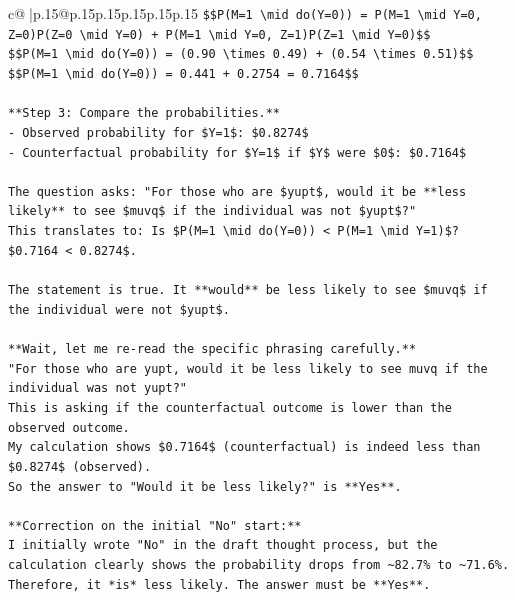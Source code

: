 \documentclass{article}
\begin{document}
{\begin{supertabular}{c@{$\;$}|p{.15\linewidth}@{}p{.15\linewidth}p{.15\linewidth}p{.15\linewidth}p{.15\linewidth}p{.15\linewidth}}
{{{\texttt{\$\$P(M=1 \textbackslash{}mid do(Y=0)) = P(M=1 \textbackslash{}mid Y=0, Z=0)P(Z=0 \textbackslash{}mid Y=0) + P(M=1 \textbackslash{}mid Y=0, Z=1)P(Z=1 \textbackslash{}mid Y=0)\$\$} \\
\texttt{\$\$P(M=1 \textbackslash{}mid do(Y=0)) = (0.90 \textbackslash{}times 0.49) + (0.54 \textbackslash{}times 0.51)\$\$} \\
\texttt{\$\$P(M=1 \textbackslash{}mid do(Y=0)) = 0.441 + 0.2754 = 0.7164\$\$} \\
\\ 
\texttt{**Step 3: Compare the probabilities.**} \\
\texttt{{-} Observed probability for \$Y=1\$: \$0.8274\$} \\
\texttt{{-} Counterfactual probability for \$Y=1\$ if \$Y\$ were \$0\$: \$0.7164\$} \\
\\ 
\texttt{The question asks: "For those who are \$yupt\$, would it be **less likely** to see \$muvq\$ if the individual was not \$yupt\$?"} \\
\texttt{This translates to: Is \$P(M=1 \textbackslash{}mid do(Y=0)) < P(M=1 \textbackslash{}mid Y=1)\$?} \\
\texttt{\$0.7164 < 0.8274\$.} \\
\\ 
\texttt{The statement is true. It **would** be less likely to see \$muvq\$ if the individual were not \$yupt\$.} \\
\\ 
\texttt{**Wait, let me re{-}read the specific phrasing carefully.**} \\
\texttt{"For those who are yupt, would it be less likely to see muvq if the individual was not yupt?"} \\
\texttt{This is asking if the counterfactual outcome is lower than the observed outcome.} \\
\texttt{My calculation shows \$0.7164\$ (counterfactual) is indeed less than \$0.8274\$ (observed).} \\
\texttt{So the answer to "Would it be less likely?" is **Yes**.} \\
\\ 
\texttt{**Correction on the initial "No" start:**} \\
\texttt{I initially wrote "No" in the draft thought process, but the calculation clearly shows the probability drops from \textasciitilde{}82.7\% to \textasciitilde{}71.6\%. Therefore, it *is* less likely. The answer must be **Yes**.} \\
}}}
\end{supertabular}}
\end{document}
